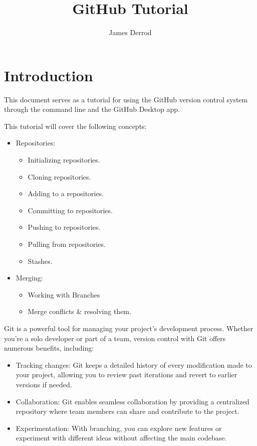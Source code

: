\documentclass[10pt,twocolumn]{article}
\title{GitHub Tutorial}
\author{James Derrod}
\affiliation{Occidental College}
\begin{document}
\maketitle

\section{Introduction}

This document serves as a tutorial for using the GitHub version control system through the command line and the GitHub Desktop app.


This tutorial will cover the following concepts:
\begin{itemize}
    \item Repositories:
    \begin{itemize}
        \item Initializing repositories.
        \item Cloning repositories.
        \item Adding to a repositories.
        \item Committing to repositories.
        \item Pushing to repositories.
        \item Pulling from repositories.
        \item Stashes.
    \end{itemize}
    \item Merging:
    \begin{itemize}
        \item Working with Branches
        \item Merge conflicts \& resolving them.
    \end{itemize}    
\end{itemize}

Git is a powerful tool for managing your project's development process. Whether you're a solo developer or part of a team, version control with Git offers numerous benefits, including:
\begin{itemize}
    \item Tracking changes: Git keeps a detailed history of every modification made to your project, allowing you to review past iterations and revert to earlier versions if needed.
    \item Collaboration: Git enables seamless collaboration by providing a centralized repository where team members can share and contribute to the project.
    \item Experimentation: With branching, you can explore new features or experiment with different ideas without affecting the main codebase.
\end{itemize}
\end{document}
